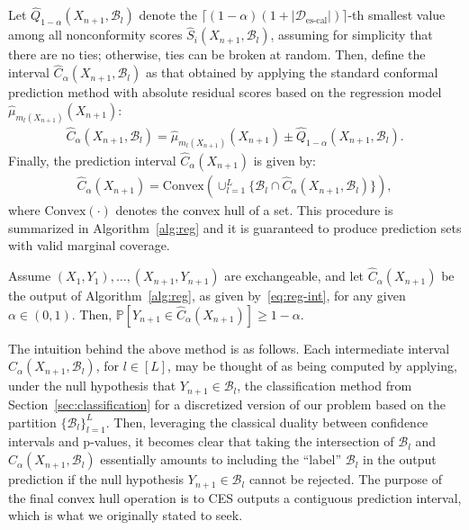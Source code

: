 Let $\hat{Q}_{1-\alpha}(X_{n+1},\mathcal{B}_l)$ denote the $\lceil (1-\alpha)(1+|\mathcal{D}_{\text{es-cal}}|) \rceil$-th smallest value among all nonconformity scores $\hat{S}_i(X_{n+1},\mathcal{B}_l)$, assuming for simplicity that there are no ties; otherwise, ties can be broken at random.
Then, define the interval $\hat{C}_{\alpha}(X_{n+1}, \mathcal{B}_l)$ as that obtained by applying the standard conformal prediction method with absolute residual scores based on the regression model $\hat{\mu}_{m_l(X_{n+1})}(X_{n+1})$:
\begin{align} \label{eq:reg-int-tmp}
  \hat{C}_{\alpha}(X_{n+1}, \mathcal{B}_l) = \hat{\mu}_{m_l(X_{n+1})}(X_{n+1}) \pm \hat{Q}_{1-\alpha}(X_{n+1},\mathcal{B}_l).
\end{align}
Finally, the prediction interval $\hat{C}_{\alpha}(X_{n+1})$ is given by:
\begin{align} \label{eq:reg-int}
  \hat{C}_{\alpha}(X_{n+1}) = \text{Convex}\left( \cup_{l=1}^{L} \{ \mathcal{B}_l \cap \hat{C}_{\alpha}(X_{n+1}, \mathcal{B}_l) \} \right),
\end{align}
where $\text{Convex}(\cdot)$ denotes the convex hull of a set.
This procedure is summarized in Algorithm~\ref{alg:reg} and it is guaranteed to produce prediction sets with valid marginal coverage.


\begin{theorem}\label{thm:reg}
Assume $(X_{1},Y_{1}), \ldots, (X_{n+1},Y_{n+1})$ are exchangeable, and let $\hat{C}_{\alpha}(X_{n+1})$ be the output of Algorithm~\ref{alg:reg}, as given by~\eqref{eq:reg-int}, for any given $\alpha \in (0,1)$.
Then, $\mathbb{P}[Y_{n+1} \in \hat{C}_{\alpha}(X_{n+1})] \geq 1-\alpha$.
\end{theorem}

The intuition behind the above method is as follows.
Each intermediate interval $\hat{C}_{\alpha}(X_{n+1}, \mathcal{B}_l)$, for $l \in [L]$, may be thought of as being computed by applying, under the null hypothesis that $Y_{n+1} \in \mathcal{B}_l$, the classification method from Section~\ref{sec:classification} for a discretized version of our problem based on the partition $\{\mathcal{B}_l\}_{l=1}^{L}$. Then, leveraging the classical duality between confidence intervals and p-values, it becomes clear that taking the intersection of $\mathcal{B}_l$ and $\hat{C}_{\alpha}(X_{n+1}, \mathcal{B}_l)$ essentially amounts to including the ``label'' $\mathcal{B}_l$ in the output prediction if the null hypothesis $Y_{n+1} \in \mathcal{B}_l$ cannot be rejected.
The purpose of the final convex hull operation is to CES outputs a contiguous prediction interval, which is what we originally stated to seek.

